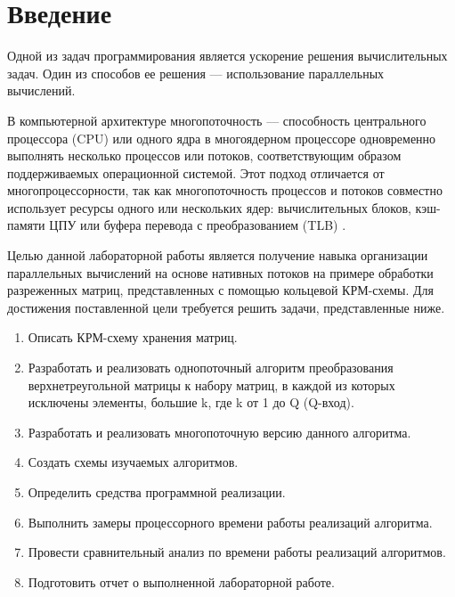 \chapter*{Введение}

Одной из задач программирования является ускорение решения вычислительных задач. Один из способов ее решения --- использование параллельных вычислений.

В компьютерной архитектуре многопоточность --- способность центрального процессора (CPU) или одного ядра в многоядерном процессоре одновременно выполнять несколько процессов или потоков, соответствующим образом поддерживаемых операционной системой. Этот подход отличается от многопроцессорности, так как многопоточность процессов и потоков совместно использует ресурсы одного или нескольких ядер: вычислительных блоков, кэш-памяти ЦПУ или буфера перевода с преобразованием (TLB) \cite{multithreading}.

Целью данной лабораторной работы является получение навыка организации параллельных вычислений на основе нативных потоков на примере обработки разреженных матриц, представленных с помощью кольцевой КРМ-схемы. Для достижения поставленной цели требуется решить задачи, представленные ниже.

\begin{enumerate}
	\item Описать КРМ-схему хранения матриц.
	\item Разработать и реализовать однопоточный алгоритм преобразования верхнетреугольной матрицы к набору матриц, в каждой из которых исключены элементы, большие k, где k от 1 до Q (Q-вход).
	\item Разработать и реализовать многопоточную версию данного алгоритма.
	\item Создать схемы изучаемых алгоритмов.
	\item Определить средства программной реализации.
	\item Выполнить замеры процессорного времени работы реализаций алгоритма.
	\item Провести сравнительный анализ по времени работы реализаций алгоритмов.
	\item Подготовить отчет о выполненной лабораторной работе.
\end{enumerate}
